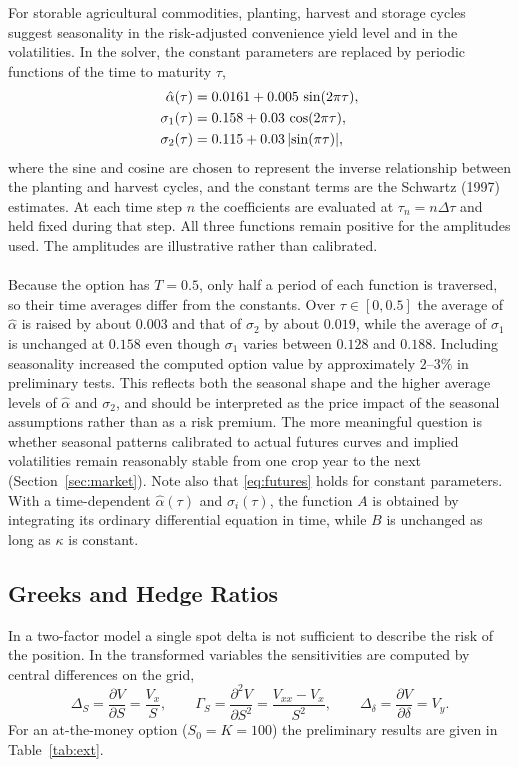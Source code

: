 \documentclass[12pt,a4paper]{article}
\begin{document}
For storable agricultural commodities, planting, harvest and storage cycles suggest seasonality in the risk-adjusted convenience yield level and in the volatilities. In the solver, the constant parameters are replaced by periodic functions of the time to maturity $\tau$,
\begin{align}
\hat\alpha(\tau)&=0.0161+0.005\,\sin(2\pi\tau),\notag\\
\sigma_1(\tau)&=0.158+0.03\,\cos(2\pi\tau),\label{eq:seasonal}\\
\sigma_2(\tau)&=0.115+0.03\,\lvert\sin(\pi\tau)\rvert,\notag
\end{align}
where the sine and cosine are chosen to represent the inverse relationship between the planting and harvest cycles, and the constant terms are the Schwartz (1997) estimates. At each time step $n$ the coefficients are evaluated at $\tau_n=n\Delta\tau$ and held fixed during that step. All three functions remain positive for the amplitudes used. The amplitudes are illustrative rather than calibrated.\\\\
Because the option has $T=0.5$, only half a period of each function is traversed, so their time averages differ from the constants. Over $\tau\in[0,0.5]$ the average of $\hat\alpha$ is raised by about $0.003$ and that of $\sigma_2$ by about $0.019$, while the average of $\sigma_1$ is unchanged at $0.158$ even though $\sigma_1$ varies between $0.128$ and $0.188$. Including seasonality increased the computed option value by approximately $2$--$3\%$ in preliminary tests. This reflects both the seasonal shape and the higher average levels of $\hat\alpha$ and $\sigma_2$, and should be interpreted as the price impact of the seasonal assumptions rather than as a risk premium. The more meaningful question is whether seasonal patterns calibrated to actual futures curves and implied volatilities remain reasonably stable from one crop year to the next (Section~\ref{sec:market}). Note also that \eqref{eq:futures} holds for constant parameters. With a time-dependent $\hat\alpha(\tau)$ and $\sigma_i(\tau)$, the function $A$ is obtained by integrating its ordinary differential equation in time, while $B$ is unchanged as long as $\kappa$ is constant.

\subsection{Greeks and Hedge Ratios}\label{sec:greeks}

In a two-factor model a single spot delta is not sufficient to describe the risk of the position. In the transformed variables the sensitivities are computed by central differences on the grid,
\begin{equation}
\Delta_S=\frac{\partial V}{\partial S}=\frac{V_x}{S},\qquad
\Gamma_S=\frac{\partial^2V}{\partial S^2}=\frac{V_{xx}-V_x}{S^2},\qquad
\Delta_\delta=\frac{\partial V}{\partial\delta}=V_y .
\end{equation}
For an at-the-money option ($S_0=K=100$) the preliminary results are given in Table~\ref{tab:ext}.
\end{document}
